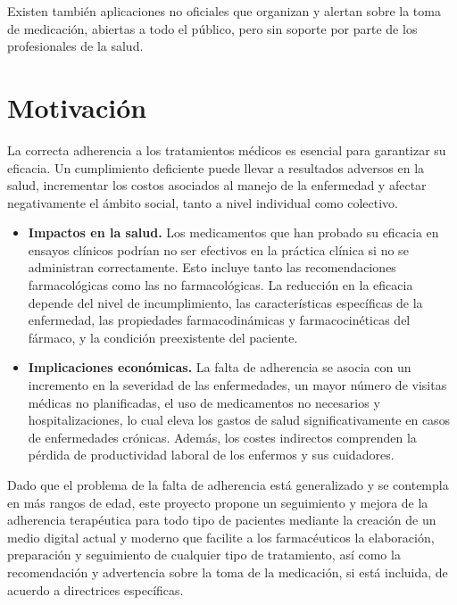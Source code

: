 Existen también aplicaciones no oficiales que organizan y alertan sobre la toma de medicación, abiertas a todo el público, pero sin soporte por parte de los profesionales de la salud.  \\



\section{Motivación}

La correcta adherencia a los tratamientos médicos es esencial para garantizar su eficacia. Un cumplimiento deficiente puede llevar a resultados adversos en la salud, incrementar los costos asociados al manejo de la enfermedad y afectar negativamente el ámbito social, tanto a nivel individual como colectivo.

\begin{itemize}
	\item \textbf{Impactos en la salud.} Los medicamentos que han probado su eficacia en ensayos clínicos podrían no ser efectivos en la práctica clínica si no se administran correctamente. Esto incluye tanto las recomendaciones farmacológicas como las no farmacológicas. La reducción en la eficacia depende del nivel de incumplimiento, las características específicas de la enfermedad, las propiedades farmacodinámicas y farmacocinéticas del fármaco, y la condición preexistente del paciente. \cite{libroblanco2021} 
	
	\item \textbf{Implicaciones económicas.} La falta de adherencia se asocia con un incremento en la severidad de las enfermedades, un mayor número de visitas médicas no planificadas, el uso de medicamentos no necesarios y hospitalizaciones, lo cual eleva los gastos de salud significativamente en casos de enfermedades crónicas. Además, los costes indirectos comprenden la pérdida de productividad laboral de los enfermos y sus cuidadores. \cite{libroblanco2021}
\end{itemize}

Dado que el problema de la falta de adherencia está generalizado y se contempla en más rangos de edad, este proyecto propone un seguimiento y mejora de la adherencia terapéutica para todo tipo de pacientes mediante la creación de un medio digital actual y moderno que facilite a los farmacéuticos la elaboración, preparación y seguimiento de cualquier tipo de tratamiento, así como la recomendación y advertencia sobre la toma de la medicación, si está incluida, de acuerdo a directrices específicas.


